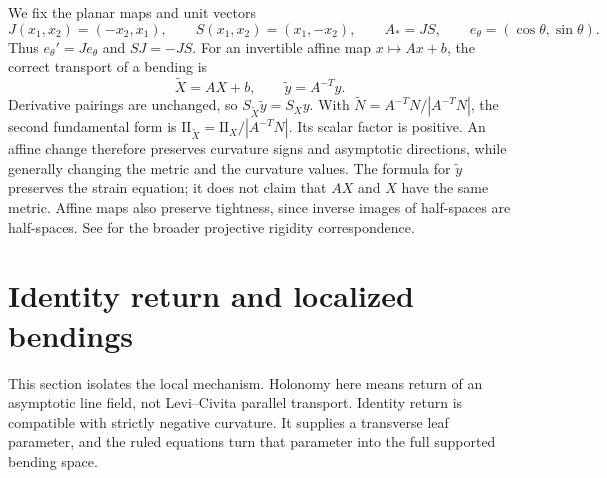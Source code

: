 \documentclass[11pt]{amsart}
\theoremstyle{definition}
\theoremstyle{remark}
\newcommand{\II}{\mathrm{II}}\newcommand{\Gmap}{\mathcal G}
\numberwithin{equation}{section}
\begin{document}
We fix the planar maps and unit vectors
\[
 J(x_1,x_2)=(-x_2,x_1),\qquad S(x_1,x_2)=(x_1,-x_2),
 \qquad A_*=JS,\qquad e_\theta=(\cos\theta,\sin\theta).
\]
Thus $e_\theta'=Je_\theta$ and $SJ=-JS$.
For an invertible affine map $x\mapsto Ax+b$, the correct transport of
a bending is
\begin{equation}\label{eq:affine-transport}
 \widetilde X=AX+b,\qquad \widetilde y=A^{-T}y.
\end{equation}
Derivative pairings are unchanged, so $S_{\widetilde X}\widetilde y=S_Xy$.
With $\widetilde N=A^{-T}N/|A^{-T}N|$, the second fundamental form is
$\II_{\widetilde X}=\II_X/|A^{-T}N|$. Its scalar factor is positive.
An affine change therefore preserves curvature signs and asymptotic
directions, while generally changing the metric and the curvature values.
The formula for $\widetilde y$ preserves the strain equation; it does
not claim that $AX$ and $X$ have the same metric. Affine maps also preserve
tightness, since inverse images of half-spaces are half-spaces.
See \cite{IzmProj} for the broader projective rigidity correspondence.

\section{Identity return and localized bendings}\label{sec:theory}
\label{sec:ruled}
This section isolates the local mechanism. Holonomy here means return of
an asymptotic line field, not Levi--Civita parallel transport. Identity
return is compatible with strictly negative curvature. It supplies a
transverse leaf parameter, and the ruled equations turn that parameter
into the full supported bending space.
\end{document}
